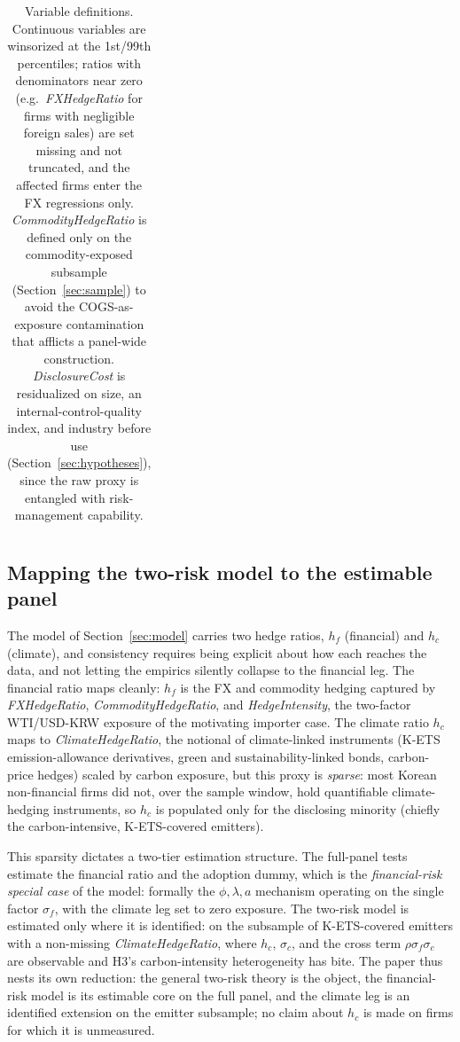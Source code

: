 \documentclass[11pt,a4paper]{article}
\begin{document}
\begin{table}[h]
\begin{tabular}{>{\raggedright\arraybackslash}p{4.4cm} >{\raggedright\arraybackslash}p{6.3cm} >{\raggedright\arraybackslash}p{2.6cm}}
\bottomrule
\end{tabular}
\caption{Variable definitions. Continuous variables are winsorized at the 1st/99th percentiles; ratios with denominators near zero (e.g.\ \emph{FXHedgeRatio} for firms with negligible foreign sales) are set missing and not truncated, and the affected firms enter the FX regressions only. \emph{CommodityHedgeRatio} is defined only on the commodity-exposed subsample (Section~\ref{sec:sample}) to avoid the COGS-as-exposure contamination that afflicts a panel-wide construction. \emph{DisclosureCost} is residualized on size, an internal-control-quality index, and industry before use (Section~\ref{sec:hypotheses}), since the raw proxy is entangled with risk-management capability.}
\label{tab:variables}
\end{table}

\subsection{Mapping the two-risk model to the estimable panel}
\label{sec:mapping}

The model of Section~\ref{sec:model} carries two hedge ratios, $h_f$ (financial) and $h_c$ (climate), and consistency requires being explicit about how each reaches the data, and not letting the empirics silently collapse to the financial leg. The financial ratio maps cleanly: $h_f$ is the FX and commodity hedging captured by \emph{FXHedgeRatio}, \emph{CommodityHedgeRatio}, and \emph{HedgeIntensity}, the two-factor WTI/USD-KRW exposure of the motivating importer case. The climate ratio $h_c$ maps to \emph{ClimateHedgeRatio}, the notional of climate-linked instruments (K-ETS emission-allowance derivatives, green and sustainability-linked bonds, carbon-price hedges) scaled by carbon exposure, but this proxy is \emph{sparse}: most Korean non-financial firms did not, over the sample window, hold quantifiable climate-hedging instruments, so $h_c$ is populated only for the disclosing minority (chiefly the carbon-intensive, K-ETS-covered emitters).

This sparsity dictates a two-tier estimation structure. The full-panel tests estimate the financial ratio and the adoption dummy, which is the \emph{financial-risk special case} of the model: formally the $\phi,\lambda,a$ mechanism operating on the single factor $\sigma_f$, with the climate leg set to zero exposure. The two-risk model is estimated only where it is identified: on the subsample of K-ETS-covered emitters with a non-missing \emph{ClimateHedgeRatio}, where $h_c$, $\sigma_c$, and the cross term $\rho\sigma_f\sigma_c$ are observable and H3's carbon-intensity heterogeneity has bite. The paper thus nests its own reduction: the general two-risk theory is the object, the financial-risk model is its estimable core on the full panel, and the climate leg is an identified extension on the emitter subsample; no claim about $h_c$ is made on firms for which it is unmeasured.
\end{document}

